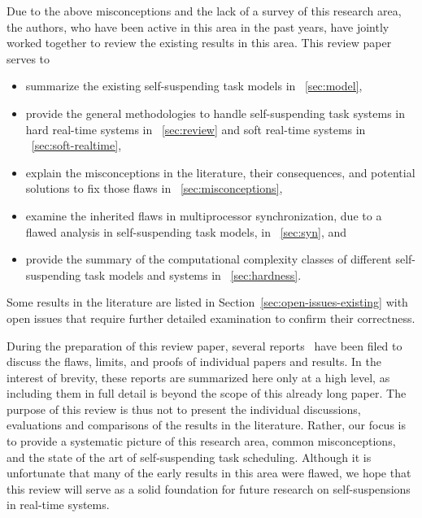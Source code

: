 \noindent Due to the above misconceptions and the lack of a survey of this research area, the authors, who have been active in this area in the past years, have jointly worked together to review the existing results in this area. This review paper serves to
\begin{itemize}
\item summarize the existing self-suspending task models in \mysectionref{}~\ref{sec:model}, 
\item provide the general methodologies to handle self-suspending task systems in hard real-time systems in \mysectionref{}~\ref{sec:review} and soft real-time systems in \mysectionref{}~\ref{sec:soft-realtime}, 
\item explain the misconceptions in the literature, their consequences, and potential solutions to fix those flaws in \mysectionref{}~\ref{sec:misconceptions}, 
\item examine the inherited flaws in multiprocessor synchronization, due to a flawed analysis in self-suspending task models, in \mysectionref{}~\ref{sec:syn}, and
\item provide the summary of the computational complexity classes of different self-suspending task models and systems in \mysectionref{}~\ref{sec:hardness}.
\end{itemize}
Some results in the literature are listed in Section~\ref{sec:open-issues-existing} with open issues that require further detailed examination to confirm their correctness. 

During the preparation of this review paper, several reports~ \cite{ChenHuangNelissen,ChenBrandenburg,erratu-cong-anderson,BletsasReport2015}  have been filed to discuss the flaws, limits, and proofs of individual papers and results. In the interest of brevity, these reports are summarized here only at a high level, as including them in full detail is beyond the scope of this already long paper.
The purpose of this review is thus not to present the individual discussions, evaluations and comparisons of the results in the literature. Rather, our focus is to provide a systematic picture of this research area, common misconceptions, and the state of the art of self-suspending task scheduling. Although it is unfortunate that many of the early results in this area were flawed, we hope that this review will serve as a solid foundation for future research on self-suspensions in real-time systems.









    
  

    
  
